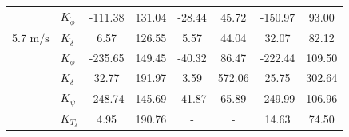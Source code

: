 \begin{table}[]
\begin{tabular}{llcccccc}
                                                   & $K_{\dot{\phi}} $                                      & -111.38                                     & 131.04                                               & -28.44                                      & 45.72                                                & -150.97                                     & 93.00                                                \\
    \multirow{-2}{*}{5.7 $\si{\meter\per\second}$} & $K_{\dot{\delta}}$                                     & 6.57                                        & 126.55                                               & 5.57                                        & 44.04                                                & 32.07                                       & 82.12                                                \\
                                                   & $K_{\phi} $                                            & -235.65                                     & 149.45                                               & -40.32                                      & 86.47                                                & -222.44                                     & 109.50                                               \\
                                                   & $K_\delta $                                            & 32.77                                       & 191.97                                               & 3.59                                        & 572.06                                               & 25.75                                       & 302.64                                               \\
                                                   & $K_\psi $                                              & -248.74                                     & 145.69                                               & -41.87                                      & 65.89                                                & -249.99                                     & 106.96                                               \\
                                                   & $K_{T_\delta}$                                         & 4.95                                        & 190.76                                               & -                                           & -                                                    & 14.63                                       & 74.50                                                \\ \cline{2-8} 

\end{tabular}
\end{table}
